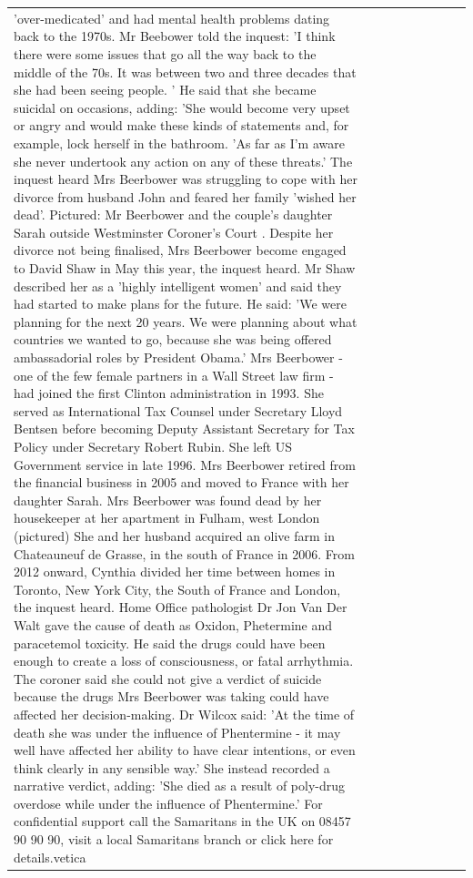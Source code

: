 \begin{table}[H]
\begin{tabular}{lllrlllll}
'over-medicated' and had mental health problems dating back to the 1970s. Mr Beebower told the inquest: 'I think there were some issues that go all the way back to the middle of the 70s. It was between two and three decades that she had been seeing people. ' He said that she became suicidal on occasions, adding: 'She would become very upset or angry and would make these kinds of statements and, for example, lock herself in the bathroom. 'As far as I'm aware she never undertook any action on any of these threats.' The inquest heard Mrs Beerbower was struggling to cope with her divorce from husband John and feared her family 'wished her dead'. Pictured: Mr Beerbower and the couple's daughter Sarah outside Westminster Coroner's Court . Despite her divorce not being finalised, Mrs Beerbower become engaged to David Shaw in May this year, the inquest heard. Mr Shaw described her as a 'highly intelligent women' and said they had started to make plans for the future. He said: 'We were planning for the next 20 years. We were planning about what countries we wanted to go, because she was being offered ambassadorial roles by President Obama.' Mrs Beerbower - one of the few female partners in a Wall Street law firm - had joined the first Clinton administration in 1993. She served as International Tax Counsel under Secretary Lloyd Bentsen before becoming Deputy Assistant Secretary for Tax Policy under Secretary Robert Rubin. She left US Government service in late 1996. Mrs Beerbower retired from the financial business in 2005 and moved to France with her daughter Sarah. Mrs Beerbower was found dead by her housekeeper at her apartment in Fulham, west London (pictured) She and her husband acquired an olive farm in Chateauneuf de Grasse, in the south of France in 2006. From 2012 onward, Cynthia divided her time between homes in Toronto, New York City, the South of France and London, the inquest heard. Home Office pathologist Dr Jon Van Der Walt gave the cause of death as Oxidon, Phetermine and paracetemol toxicity. He said the drugs could have been enough to create a loss of consciousness, or fatal arrhythmia. The coroner said she could not give a verdict of suicide because the drugs Mrs Beerbower was taking could have affected her decision-making. Dr Wilcox said: 'At the time of death she was under the influence of Phentermine - it may well have affected her ability to have clear intentions, or even think clearly in any sensible way.' She instead recorded a narrative verdict, adding: 'She died as a result of poly-drug overdose while under the influence of Phentermine.' For confidential support call the Samaritans in the UK on 08457 90 90 90, visit a local Samaritans branch or click here for details.vetica \\

\end{tabular}
\end{table}
